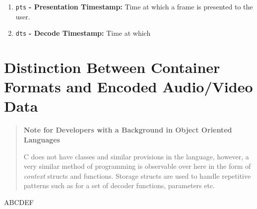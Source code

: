 \documentclass{article}
\begin{document}
\begin{enumerate}
\item \texttt{pts} \textbf{- Presentation Timestamp:} Time at which a frame is 
      presented to the user.
\item \texttt{dts} \textbf{- Decode Timestamp:} Time at which 
\end{enumerate}

\section{Distinction Between Container Formats and Encoded Audio/Video Data}
\begin{quote}
\textbf{Note for Developers with a Background in Object Oriented Languages}

C does not have classes and similar provisions in the language, however, a very 
similar method of programming is observable over here in the form of 
\emph{context} structs and functions. Storage structs are used to handle 
repetitive patterns such as for a set of decoder functions, parameters etc.


\end{quote}


\begin{thebibliography}{9}
	ABCDEF
\end{thebibliography}
\end{document}
